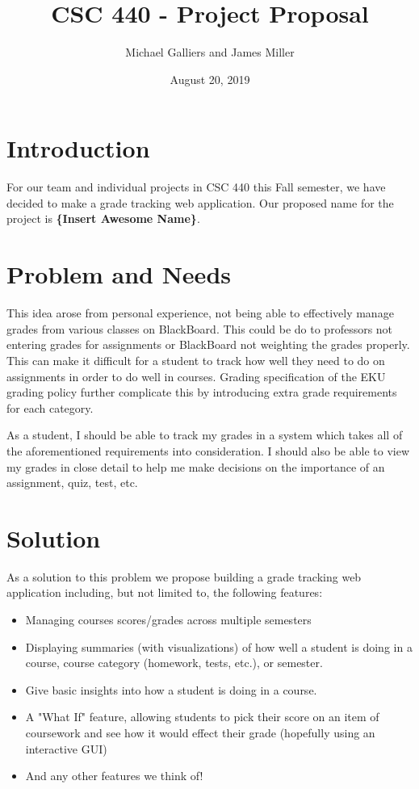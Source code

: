 \documentclass{article}
\author{Michael Galliers and James Miller}
\title{CSC 440 - Project Proposal}
\date{August 20, 2019}
\begin{document}
\begin{titlepage}
\maketitle
\end{titlepage}

\tableofcontents

\section{Introduction}
For our team and individual projects in CSC 440 this Fall semester, we have decided to make a grade
tracking web application. Our proposed name for the project is \textbf{\{Insert Awesome Name\}}.

\section{Problem and Needs}
This idea arose from personal experience, not being able to effectively manage grades from various
classes on BlackBoard. This could be do to professors not entering grades for assignments or
BlackBoard not weighting the grades properly. This can make it difficult for a student to track how
well they need to do on assignments in order to do well in courses. Grading specification of the EKU
grading policy further complicate this by introducing extra grade requirements for each category.

As a student, I should be able to track my grades in a system which takes all of the aforementioned
requirements into consideration. I should also be able to view my grades in close detail to help me
make decisions on the importance of an assignment, quiz, test, etc.

\section{Solution}
As a solution to this problem we propose building a grade tracking web application including, but
not limited to, the following features:

\begin{itemize}
    \item Managing courses scores/grades across multiple semesters
    \item Displaying summaries (with visualizations) of how well a student is doing in a course,
    course category (homework, tests, etc.), or semester.
    \item Give basic insights into how a student is doing in a course.
    \item A "What If" feature, allowing students to pick their score on an item of coursework and
    see how it would effect their grade (hopefully using an interactive GUI)
    \item And any other features we think of!
\end{itemize}
\end{document}
